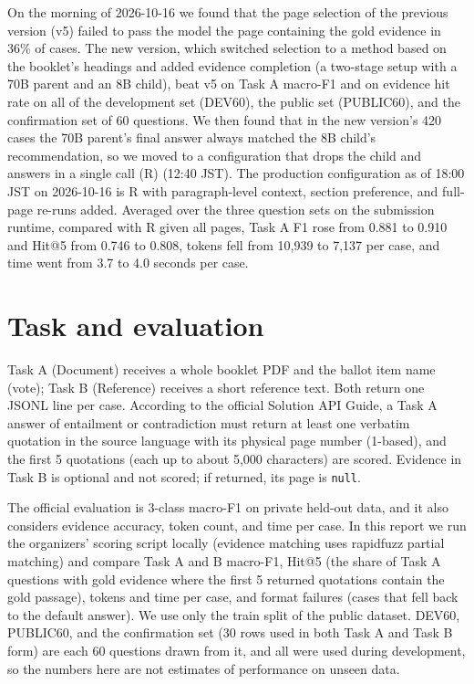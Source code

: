 \documentclass[10pt,a4paper]{article}
\begin{document}
On the morning of 2026-10-16 we found that the page selection of the previous version (v5) failed to pass the model the page containing the gold evidence in 36\% of cases.
The new version, which switched selection to a method based on the booklet's headings and added evidence completion (a two-stage setup with a 70B parent and an 8B child), beat v5 on Task A macro-F1 and on evidence hit rate on all of the development set (DEV60), the public set (PUBLIC60), and the confirmation set of 60 questions.
We then found that in the new version's 420 cases the 70B parent's final answer always matched the 8B child's recommendation, so we moved to a configuration that drops the child and answers in a single call (R) (12:40 JST).
The production configuration as of 18:00 JST on 2026-10-16 is R with paragraph-level context, section preference, and full-page re-runs added.
Averaged over the three question sets on the submission runtime, compared with R given all pages, Task A F1 rose from 0.881 to 0.910 and Hit@5 from 0.746 to 0.808, tokens fell from 10,939 to 7,137 per case, and time went from 3.7 to 4.0 seconds per case.

\section{Task and evaluation}
\label{sec:eval}

Task A (Document) receives a whole booklet PDF and the ballot item name (vote); Task B (Reference) receives a short reference text. Both return one JSONL line per case.
According to the official Solution API Guide\cite{apiguide}, a Task A answer of entailment or contradiction must return at least one verbatim quotation in the source language with its physical page number (1-based), and the first 5 quotations (each up to about 5,000 characters) are scored.
Evidence in Task B is optional and not scored; if returned, its page is \texttt{null}.

The official evaluation is 3-class macro-F1 on private held-out data, and it also considers evidence accuracy, token count, and time per case\cite{ostchallenge,apiguide}.
In this report we run the organizers' scoring script locally (evidence matching uses rapidfuzz\cite{rapidfuzz} partial matching) and compare Task A and B macro-F1, Hit@5 (the share of Task A questions with gold evidence where the first 5 returned quotations contain the gold passage), tokens and time per case, and format failures (cases that fell back to the default answer).
We use only the train split of the public dataset\cite{dataset}. DEV60, PUBLIC60, and the confirmation set (30 rows used in both Task A and Task B form) are each 60 questions drawn from it, and all were used during development, so the numbers here are not estimates of performance on unseen data.
\end{document}
